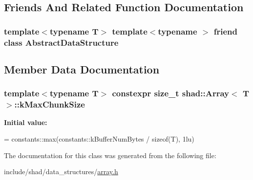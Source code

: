 \subsection{Friends And Related Function Documentation}
\hypertarget{classshad_1_1Array_ab18afa4496cc863ddc11bab94b2adf57}{
\subsubsection[{Abstract\-Data\-Structure}]{\setlength{\rightskip}{0pt plus 5cm}template$<$typename T$>$ template$<$typename $>$ friend class {\bf Abstract\-Data\-Structure}\hspace{0.3cm}{\ttfamily [friend]}}}\label{classshad_1_1Array_ab18afa4496cc863ddc11bab94b2adf57}


\subsection{Member Data Documentation}
\hypertarget{classshad_1_1Array_af4d2703149c199273eae358d1bcd8ade}{
\subsubsection[{k\-Max\-Chunk\-Size}]{\setlength{\rightskip}{0pt plus 5cm}template$<$typename T$>$ constexpr size\-\_\-t {\bf shad\-::\-Array}$<$ T $>$\-::k\-Max\-Chunk\-Size\hspace{0.3cm}{\ttfamily [static]}}}\label{classshad_1_1Array_af4d2703149c199273eae358d1bcd8ade}
{\bfseries Initial value\-:}
\begin{DoxyCode}
=
      constants::max(constants::kBufferNumBytes / \textcolor{keyword}{sizeof}(T), 1lu)
\end{DoxyCode}


The documentation for this class was generated from the following file\-:\begin{DoxyCompactItemize}
\item 
include/shad/data\-\_\-structures/\hyperlink{data__structures_2array_8h}{array.\-h}\end{DoxyCompactItemize}
